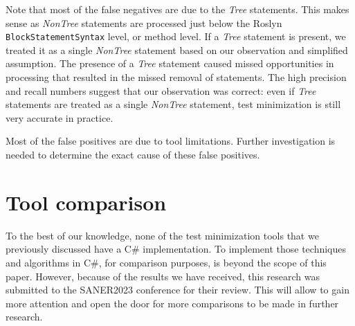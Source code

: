 Note that most of the false negatives are due to the \emph{Tree} statements. This makes sense as \emph{NonTree} statements are processed just below the Roslyn~\cite{wagner_2021} \texttt{BlockStatementSyntax} level, or method level. If a \emph{Tree} statement is present, we treated it as a single \emph{NonTree} statement based on our observation and simplified assumption. The presence of a \emph{Tree} statement caused missed opportunities in processing that resulted in the missed removal of statements. The high precision and recall numbers suggest that our observation was correct: even if \emph{Tree} statements are treated as a single \emph{NonTree} statement, test minimization is still very accurate in practice.

Most of the false positives are due to tool limitations. Further investigation is needed to determine the exact cause of these false positives.

\section{Tool comparison}
To the best of our knowledge, none of the test minimization tools that we previously discussed have a C\# implementation. To implement those techniques and algorithms in C\#, for comparison purposes, is beyond the scope of this paper. However, because of the results we have received, this research was submitted to the SANER2023 conference for their review. This will allow \mytool to gain more attention and open the door for more comparisons to be made in further research.


